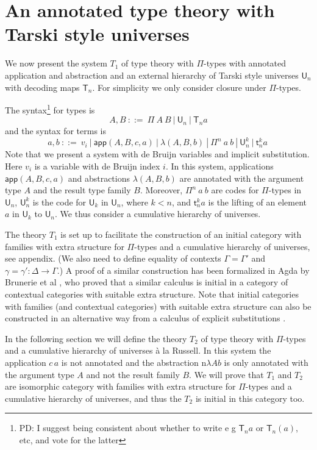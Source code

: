\documentclass[11pt,a4paper]{article}
\theoremstyle{definition}
\def\UU{\mathsf{U}}
\newcommand{\LAM}{\lambda}
\newcommand{\APP}{\mathsf{app}}
\newcommand{\T}{\mathsf{T}}
\newcommand{\sT}{\mathsf{t}}
\begin{document}
\section{An annotated type theory with Tarski style universes}

We now present the system $T_1$ of type theory with $\Pi$-types with annotated application and abstraction and an external hierarchy of Tarski style universes $\UU_n$ with decoding maps $\T_n$. For simplicity we only consider closure under $\Pi$-types. 

The syntax\footnote{PD: I suggest being consistent about whether to write e g $\T_n a$ or $\T_n(a)$, etc, and vote for the latter} for types is
$$
A,B~::=~\Pi~{A}~B~|~\UU_n~|~\T_n a
$$
and the syntax for terms is
$$
a,b~::=~v_i~|~\APP(A,B,c,a)~|~\LAM(A,B,b)~|~\Pi^n~ a~b~|~\UU^k_n~|~\sT^k_n a~
$$
Note that we present a system with de Bruijn variables and implicit substitution.
Here $v_i$ is a variable with de Bruijn index $i$. In this system, applications $\APP(A,B,c,a)$ and abstractions $\LAM(A,B,b)$ are annotated with the argument type $A$ and the result type family $B$. Moreover, $\Pi^n~ a~b$ are codes for $\Pi$-types in $\UU_n$, $\UU^k_n$ is the code for $\UU_k$ in $\UU_n$, where $k < n$, and $\sT^k_n a$ is the lifting of an element $a$ in $\UU_k$ to $\UU_n$. We thus consider a cumulative hierarchy of universes.

The theory $T_1$ is set up to facilitate the construction of an initial category with families with extra structure for $\Pi$-types and a cumulative hierarchy of universes, see appendix. (We also need to define equality of contexts $\Gamma = \Gamma'$ and $\gamma = \gamma' : \Delta \to \Gamma$.) A proof of a similar construction has been formalized in Agda by Brunerie et al \cite{brunerie:initial}, who proved that a similar calculus is initial in a category of contextual categories with suitable extra structure. Note that initial categories with families (and contextual categories) with suitable extra structure can also be constructed in an alternative way from a calculus of explicit substitutions  \cite{casellan:tlca15}.

In the following section we will define the theory $T_2$ of type theory with $\Pi$-types and a cumulative hierarchy of universes \`a la Russell. In this system the application $c\,a$ is not annotated and the abstraction n$\lambda A b$ is only annotated with the argument type $A$ and not the result family $B$. We will prove that $T_1$ and $T_2$ are isomorphic 
category with families with extra structure for $\Pi$-types and a cumulative hierarchy of universes, and thus the $T_2$ is initial in this category too.
\medskip
\end{document}
